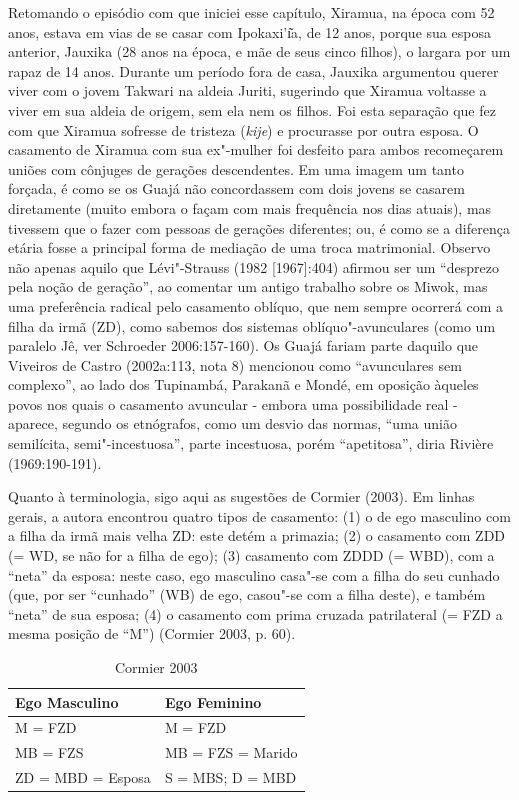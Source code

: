 Retomando o episódio com que iniciei esse capítulo, Xiramua, na época
com 52 anos, estava em vias de se casar com Ipokaxi'ı͂a, de 12 anos,
porque sua esposa anterior, Jauxika (28 anos na época, e mãe de seus
cinco filhos), o largara por um rapaz de 14 anos. Durante um período
fora de casa, Jauxika argumentou querer viver com o jovem Takwari na
aldeia Juriti, sugerindo que Xiramua voltasse a viver em sua aldeia de
origem, sem ela nem os filhos. Foi esta separação que fez com que
Xiramua sofresse de tristeza (\emph{kije}) e procurasse por outra
esposa. O casamento de Xiramua com sua ex"-mulher foi desfeito para ambos
recomeçarem uniões com cônjuges de gerações descendentes. Em uma imagem
um tanto forçada, é como se os Guajá não concordassem com dois jovens se
casarem diretamente (muito embora o façam com mais frequência nos dias
atuais), mas tivessem que o fazer com pessoas de gerações diferentes;
ou, é como se a diferença etária fosse a principal forma de mediação de
uma troca matrimonial. Observo não apenas aquilo que Lévi"-Strauss (1982
{[}1967{]}:404) afirmou ser um ``desprezo pela noção de geração'', ao
comentar um antigo trabalho sobre os Miwok, mas uma preferência radical
pelo casamento oblíquo, que nem sempre ocorrerá com a filha da irmã
(ZD), como sabemos dos sistemas oblíquo"-avunculares (como um paralelo
Jê, ver Schroeder 2006:157-160). Os Guajá fariam parte daquilo que
Viveiros de Castro (2002a:113, nota 8) mencionou como ``avunculares sem
complexo'', ao lado dos Tupinambá, Parakanã e Mondé, em oposição àqueles
povos nos quais o casamento avuncular - embora uma possibilidade real -
aparece, segundo os etnógrafos, como um desvio das normas, ``uma união
semilícita, semi"-incestuosa'', parte incestuosa, porém ``apetitosa'', diria
Rivière (1969:190-191).

Quanto à terminologia, sigo aqui as sugestões de Cormier (2003). Em
linhas gerais, a autora encontrou quatro tipos de casamento: (1) o de
ego masculino com a filha da irmã mais velha ZD: este detém a primazia;
(2) o casamento com ZDD (= WD, se não for a filha de ego); (3) casamento
com ZDDD (= WBD), com a ``neta'' da esposa: neste caso, ego masculino
casa"-se com a filha do seu cunhado (que, por ser ``cunhado'' (WB) de
ego, casou"-se com a filha deste), e também ``neta'' de sua esposa; (4) o
casamento com prima cruzada patrilateral (= FZD a mesma posição de ``M'')
(Cormier 2003, p. 60).

\begin{table}[H]
\centering
\caption{Cormier 2003}
\label{my-label}
\begin{tabular}{|l|l|}
\hline
\textbf{Ego Masculino} & \textbf{Ego Feminino} \\ \hline
M = FZD                & M = FZD               \\ \hline
MB = FZS               & MB = FZS = Marido     \\ \hline
ZD = MBD = Esposa      & S = MBS; D = MBD      \\ \hline
\end{tabular}
\end{table}

